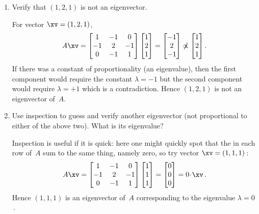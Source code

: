 \begin{example}
\begin{enumerate}
\item Verify that \((1,2,1)\) is not an eigenvector.
\begin{solution} 
For vector \(\xv=(1,2,1)\),
\begin{equation*}
A\xv=\begin{bmatrix} 1&-1&0\\-1&2&-1\\0&-1&1 \end{bmatrix}
\begin{bmatrix} 1\\2\\1 \end{bmatrix}
=\begin{bmatrix} -1\\2\\-1  \end{bmatrix}
\not\propto\begin{bmatrix} 1\\2\\1 \end{bmatrix}.
\end{equation*}
If there was a constant of proportionality (an eigenvalue), then the first component would require the constant \(\lambda=-1\) but the second component would require \(\lambda=+1\) which is a contradiction.
Hence \((1,2,1)\) is not an eigenvector of~\(A\). 
\end{solution}

\item Use inspection to guess and verify another eigenvector (not proportional to either of the above two).  
What is its eigenvalue?
\begin{solution} 
Inspection is useful if it is quick: here one might quickly spot that the  in each row of~\(A\) sum to the same thing, namely zero, so  try vector \(\xv=(1,1,1)\)\,:
\begin{equation*}
A\xv=\begin{bmatrix} 1&-1&0\\-1&2&-1\\0&-1&1 \end{bmatrix}
\begin{bmatrix} 1\\1\\1 \end{bmatrix}
=\begin{bmatrix} 0\\0\\0  \end{bmatrix}
=0\cdot\xv\,.
\end{equation*}
Hence \((1,1,1)\) is an eigenvector of~\(A\) corresponding to the eigenvalue \(\lambda=0\)\,. 
\end{solution}

\end{enumerate}
\end{example}



